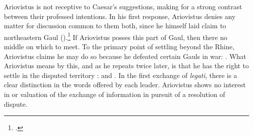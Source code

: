 \documentclass[12pt,letterpaper,oneside,final]{memoir}
\begin{document}
Ariovistus is not receptive to Caesar's suggestions, making for a strong contrast between their professed intentions. In his first response, Ariovistus denies any matter for discussion common to them both, since he himself laid claim to northeastern Gaul ().\footnote{.} If Ariovistus posses this part of Gaul, then there no middle on which to meet. To the primary point of settling beyond the Rhine, Ariovistus claims he may do so because he defeated certain Gauls in war: . What Ariovistus means by this, and as he repeats twice later, is that he has the right to settle in the disputed territory :  and . In the first exchange of \emph{legati}, there is a clear distinction in the words offered by each leader. Ariovistus shows no interest in or valuation of the exchange of information in pursuit of a resolution of dispute.
\end{document}
